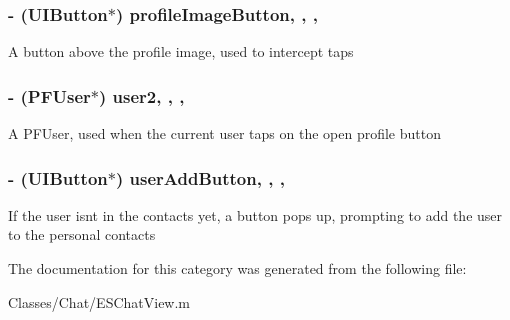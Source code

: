 \subsubsection[{profile\+Image\+Button}]{\setlength{\rightskip}{0pt plus 5cm}-\/ (U\+I\+Button$\ast$) profile\+Image\+Button\hspace{0.3cm}{\ttfamily [read]}, {\ttfamily [write]}, {\ttfamily [nonatomic]}, {\ttfamily [strong]}}\label{category_e_s_chat_view_07_08_a25a71b1a985e2393e255845bed75a80a}
A button above the profile image, used to intercept taps \hypertarget{category_e_s_chat_view_07_08_a0864ebca557071365e5f35e30129fec5}{}
\subsubsection[{user2}]{\setlength{\rightskip}{0pt plus 5cm}-\/ (P\+F\+User$\ast$) user2\hspace{0.3cm}{\ttfamily [read]}, {\ttfamily [write]}, {\ttfamily [nonatomic]}, {\ttfamily [strong]}}\label{category_e_s_chat_view_07_08_a0864ebca557071365e5f35e30129fec5}
A P\+F\+User, used when the current user taps on the open profile button \hypertarget{category_e_s_chat_view_07_08_a7e7807bda5aa1ad964614862687c0059}{}
\subsubsection[{user\+Add\+Button}]{\setlength{\rightskip}{0pt plus 5cm}-\/ (U\+I\+Button$\ast$) user\+Add\+Button\hspace{0.3cm}{\ttfamily [read]}, {\ttfamily [write]}, {\ttfamily [nonatomic]}, {\ttfamily [strong]}}\label{category_e_s_chat_view_07_08_a7e7807bda5aa1ad964614862687c0059}
If the user isn\textquotesingle{}t in the contacts yet, a button pops up, prompting to add the user to the personal contacts 

The documentation for this category was generated from the following file\+:\begin{DoxyCompactItemize}
\item 
Classes/\+Chat/E\+S\+Chat\+View.\+m\end{DoxyCompactItemize}
